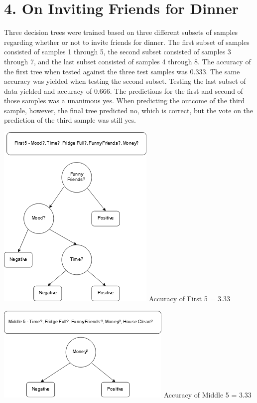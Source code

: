 \documentclass{article}
\begin{document}
\section*{4. On Inviting Friends for Dinner}

\noindent Three decision trees were trained based on three different subsets of samples regarding whether or not to invite friends for dinner. The first subset of samples consisted of samples 1 through 5, the second subset consisted of samples 3 through 7, and the last subset consisted of samples 4 through 8. The accuracy of the first tree when tested against the three test samples was 0.333. The same accuracy was yielded when testing the second subset. Testing the last subset of data yielded and accuracy of 0.666. The predictions for the first and second of those samples was a unanimous yes. When predicting the outcome of the third sample, however, the final tree predicted no, which is correct, but the vote on the prediction of the third sample was still yes.

\begin{center}
    \includegraphics[scale=1]{First.png}
    \newline \newline Accuracy of First 5 = 3.33%
\end{center}

\begin{center}
    \includegraphics[scale=1]{Middle.png}
    \newline \newline Accuracy of Middle 5 = 3.33%
\end{center}
\end{document}
